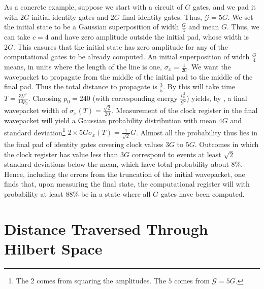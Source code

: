 \documentclass[11pt]{article}
\begin{document}
As a concrete example, suppose we start with a circuit of $G$ gates, and we pad it with $2G$ initial identity gates and $2G$ final identity gates. Thus, $\mathcal{G} = 5G$. We set the initial state to be a Gaussian superposition of width $\frac{G}{4}$ and mean $G$. Thus, we can take $c = 4$ and have zero amplitude outside the initial pad, whose width is $2G$. This ensures that the initial state has zero amplitude for any of the computational gates to be already computed. An initial superposition of width $\frac{G}{4}$ means, in units where the length of the line is one, $\sigma_x = \frac{1}{20}$. We want the wavepacket to propagate from the middle of the initial pad to the middle of the final pad. Thus the total distance to propagate is $\frac{3}{5}$. By  this will take time $T = \frac{3 \mathcal{G}^2}{10 p_0}$. Choosing $p_0 = 240$ (with corresponding energy $\frac{p_0^2}{\mathcal{G}^2}$) yields, by , a final wavepacket width of $\sigma_x(T) = \frac{\sqrt{2}}{20}$. Measurement of the clock register in the final wavepacket will yield a Gaussian probability distribution with mean $4G$ and standard deviation\footnote{The 2 comes from squaring the amplitudes. The $5$ comes from $\mathcal{G} = 5G$.} $2 \times 5G \sigma_x(T) = \frac{1}{\sqrt{2}} G$. Almost all the probability thus lies in the final pad of identity gates covering clock values $3G$ to $5G$.  Outcomes in which the clock register has value less than $3G$ correspond to events at least $\sqrt{2}$ standard deviations below the mean, which have total probability about $8\%$. Hence, including the errors from the truncation of the initial wavepacket, one finds that, upon measuring the final state, the computational register will with probability at least $88\%$ be in a state where all $G$ gates have been computed.

\section{Distance Traversed Through Hilbert Space}
\end{document}
